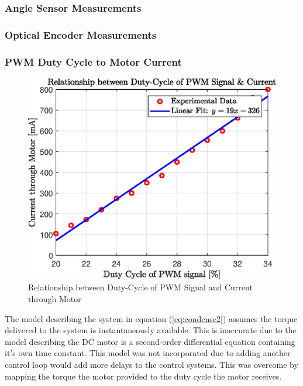 \subsubsection{Angle Sensor Measurements}

\subsubsection{Optical Encoder Measurements}

\subsubsection{ PWM Duty Cycle to Motor Current}

\begin{figure}[h]
	\centering
	\includegraphics[scale=1]{./figs/dutycycle_vs_current.eps}
	\caption{Relationship between Duty-Cycle of PWM Signal and Current through Motor}
	\label{fig:dutycycle_vs_current}
\end{figure}

The model describing the system in equation (\ref{eq:condense2}) assumes the torque delivered to the system is instantaneously available. This is inaccurate due to the model describing the DC motor is a second-order differential equation containing it's own time constant. This model was not incorporated due to adding another control loop would add more delays to the control systems. This was overcome by mapping the torque the motor provided to the duty cycle the motor receives.\\

